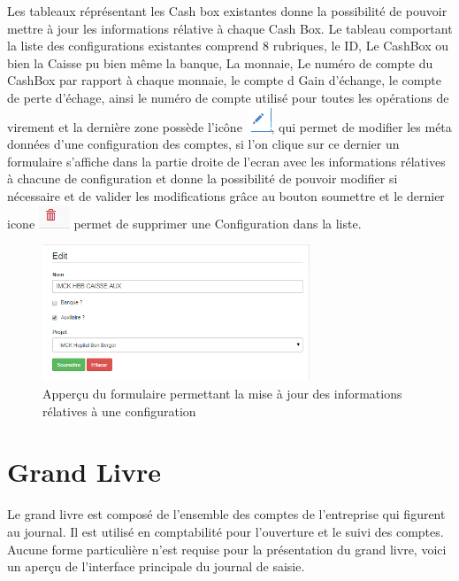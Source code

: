 \documentclass[12pt,a4paper]{report}
\begin{document}
Les tableaux réprésentant les Cash box existantes donne la possibilité de pouvoir mettre à jour les informations rélative à chaque Cash Box. Le tableau comportant la liste des configurations existantes comprend 8 rubriques, le ID, Le CashBox ou bien la Caisse pu bien même la banque, La monnaie, Le numéro de compte du CashBox par rapport à chaque monnaie, le compte d Gain d'échange, le compte de perte d'échage, ainsi le numéro de compte utilisé pour toutes les opérations de virement et la dernière  zone possède l'icône \includegraphics[scale=0.7]{pic/EditUser.png}, qui permet de modifier les méta données d'une configuration des comptes, si l'on clique sur ce dernier un formulaire s'affiche dans la partie droite de l'ecran avec les informations rélatives à chacune de configuration et donne la possibilité de pouvoir modifier si nécessaire et de valider les modifications grâce au bouton soumettre et le dernier icone \includegraphics[scale=0.7]{pic/DeleteWRed.png} permet de supprimer une Configuration dans la liste.
\begin{figure}[h]
\begin{center}
\includegraphics[width=8cm]{pic/EditCashBox.png}
\end{center}
\caption{Apperçu du formulaire permettant la mise à jour des informations rélatives à une configuration}
\label{Apperçu du formulaire permettant la mise à jour des informations rélatives à une configuration}
\end{figure} 

\newpage
\section{Grand Livre}
Le grand livre est composé de l’ensemble des comptes de l’entreprise qui figurent au journal. Il est utilisé en comptabilité pour l’ouverture et le suivi des comptes. Aucune forme particulière n’est requise pour la présentation du grand livre, voici un aperçu de l'interface principale du journal de saisie.
\end{document}
